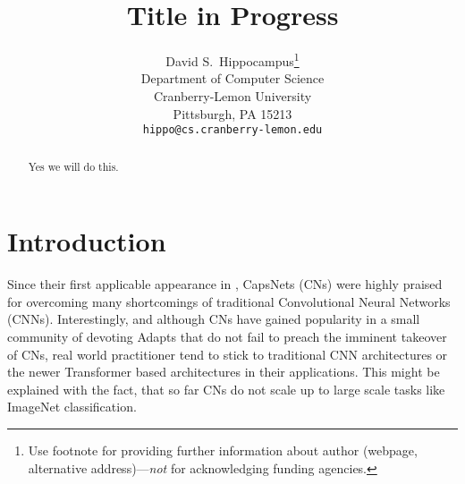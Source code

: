 \documentclass{article}
\title{Title in Progress}
\author{%
  David S.~Hippocampus\thanks{Use footnote for providing further information
    about author (webpage, alternative address)---\emph{not} for acknowledging
    funding agencies.} \\
  Department of Computer Science\\
  Cranberry-Lemon University\\
  Pittsburgh, PA 15213 \\
  \texttt{hippo@cs.cranberry-lemon.edu} \\
}
\begin{document}
\maketitle

\begin{abstract}
  Yes we will do this.
\end{abstract}

\section{Introduction}

Since their first applicable appearance in \cite{DBLP:conf/nips/SabourFH17}, CapsNets (CNs) were highly praised for overcoming many shortcomings of traditional Convolutional Neural Networks (CNNs). Interestingly, and although CNs have gained popularity in a small community of devoting Adapts that do not fail to preach the imminent takeover of CNs, real world practitioner tend to stick to traditional CNN architectures or the newer Transformer based architectures in their applications. This might be explained with the fact, that so far CNs do not scale up to large scale tasks like ImageNet classification.
\end{document}
